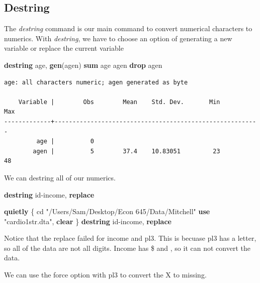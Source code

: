 \documentclass[
]{book}
\newenvironment{Shaded}{\begin{snugshade}}{\end{snugshade}}
\newcommand{\KeywordTok}[1]{\textcolor[rgb]{0.13,0.29,0.53}{\textbf{#1}}}
\newcommand{\NormalTok}[1]{#1}
\newcommand{\StringTok}[1]{\textcolor[rgb]{0.31,0.60,0.02}{#1}}
\begin{document}
\subsection{Destring}\label{destring}

The \emph{destring} command is our main command to convert numerical characters to numerics. With \emph{destring}, we have to choose an option of generating a new variable or replace the current variable

\begin{Shaded}
\begin{Highlighting}[]
\KeywordTok{destring}\NormalTok{ age, }\KeywordTok{gen}\NormalTok{(agen)}
\KeywordTok{sum}\NormalTok{ age agen}
\KeywordTok{drop}\NormalTok{ agen}
\end{Highlighting}
\end{Shaded}

\begin{verbatim}
age: all characters numeric; agen generated as byte

    Variable |        Obs        Mean    Std. Dev.       Min        Max
-------------+---------------------------------------------------------
         age |          0
        agen |          5        37.4    10.83051         23         48
\end{verbatim}

We can destring all of our numerics.

\begin{Shaded}
\begin{Highlighting}[]
\KeywordTok{destring}\NormalTok{ id{-}income, }\KeywordTok{replace}
\end{Highlighting}
\end{Shaded}

\begin{Shaded}
\begin{Highlighting}[]
\KeywordTok{quietly}\NormalTok{ \{}
\NormalTok{cd }\StringTok{"/Users/Sam/Desktop/Econ 645/Data/Mitchell"}
\KeywordTok{use} \StringTok{"cardio1str.dta"}\NormalTok{, }\KeywordTok{clear}
\NormalTok{\}}
\KeywordTok{destring}\NormalTok{ id{-}income, }\KeywordTok{replace}
\end{Highlighting}
\end{Shaded}

Notice that the replace failed for income and pl3. This is becuase pl3 has a letter, so all of the data are not all digits. Income has \$ and , so it can not convert the data.

We can use the force option with pl3 to convert the X to missing.
\end{document}
